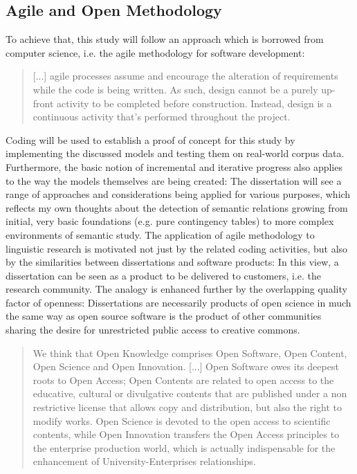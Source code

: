 \documentclass[jou]{apa6} %
\begin{document}
\subsection{Agile and Open Methodology}

To achieve that, this study will follow an approach which is borrowed from computer science, i.e. the agile methodology for software development:
\blockquote[{\cite[p.~32]{fowlerAgileManifesto2001}}]{[...] agile processes assume and encourage the alteration of requirements while the code is being written. As such, design cannot be a purely up-front activity to be completed before construction. Instead, design is a continuous activity that's performed throughout the project.}
Coding will be used to establish a proof of concept for this study by implementing the discussed models and testing them on real-world corpus data. Furthermore, the basic notion of incremental and iterative progress also applies to the way the models themselves are being created: The dissertation will see a range of approaches and considerations being applied for various purposes, which reflects my own thoughts about the detection of semantic relations growing from initial, very basic foundations (e.g. pure contingency tables) to more complex environments of semantic study. The application of agile methodology to linguistic research is motivated not just by the related coding activities, but also by the similarities between dissertations and software products: In this view, a dissertation can be seen as a product to be delivered to customers, i.e. the research community. The analogy is enhanced further by the overlapping quality factor of openness: Dissertations are necessarily products of open science in much the same way as open source software is the product of other communities sharing the desire for unrestricted public access to creative commons.
\blockquote[{\cite[p.~518]{garcia-penalvoOpenKnowledgeManagement2010}}]{We think that Open Knowledge comprises Open Software, Open Content, Open Science and Open Innovation. [...] Open Software owes its deepest roots to Open Access; Open Contents are related to open access to the educative, cultural or divulgative contents that are published under a non restrictive license that allows copy and distribution, but also the right to modify works. Open Science is devoted to the open access to scientific contents, while Open Innovation transfers the Open Access principles to the enterprise production world, which is actually indispensable for the enhancement of University-Enterprises relationships.}
\end{document}
